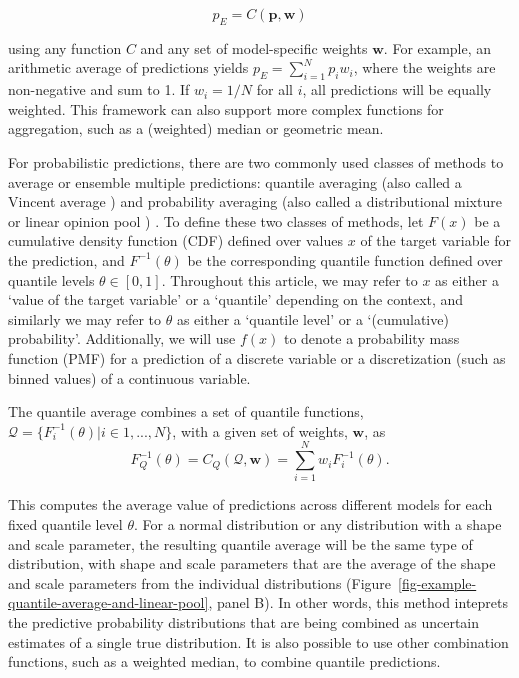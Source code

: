 \documentclass[
  article,
  shortnames,
  notitle]{jss}
\begin{document}
\[
p_E = C(\pmb{p}, \pmb{w}) 
\]

using any function \(C\) and any set of model-specific weights
\(\pmb{w}\). For example, an arithmetic average of predictions yields
\(p_E = \sum_{i=1}^Np_iw_i\), where the weights are non-negative and sum
to 1. If \(w_i = 1/N\) for all \(i\), all predictions will be equally
weighted. This framework can also support more complex functions for
aggregation, such as a (weighted) median or geometric mean.

For probabilistic predictions, there are two commonly used classes of
methods to average or ensemble multiple predictions: quantile averaging
(also called a Vincent average \citep{vincent1912}) and probability
averaging (also called a distributional mixture or linear opinion pool
\citep{stone1961}) \citep{lichtendahl2013}. To define these two classes
of methods, let \(F(x)\) be a cumulative density function (CDF) defined
over values \(x\) of the target variable for the prediction, and
\(F^{-1}(\theta)\) be the corresponding quantile function defined over
quantile levels \(\theta \in [0, 1]\). Throughout this article, we may
refer to \(x\) as either a `value of the target variable' or a
`quantile' depending on the context, and similarly we may refer to
\(\theta\) as either a `quantile level' or a `(cumulative) probability'.
Additionally, we will use \(f(x)\) to denote a probability mass function
(PMF) for a prediction of a discrete variable or a discretization (such
as binned values) of a continuous variable.

The quantile average combines a set of quantile functions,
\(\mathcal{Q} = \{F_i^{-1}(\theta)| i \in 1,...,N \}\), with a given set
of weights, \(\pmb{w}\), as \[
F^{-1}_Q(\theta) = C_Q(\mathcal{Q}, \pmb{w}) = \sum_{i = 1}^Nw_iF^{-1}_i(\theta).
\]

This computes the average value of predictions across different models
for each fixed quantile level \(\theta\). For a normal distribution or
any distribution with a shape and scale parameter, the resulting
quantile average will be the same type of distribution, with shape and
scale parameters that are the average of the shape and scale parameters
from the individual distributions
(Figure~\ref{fig-example-quantile-average-and-linear-pool}, panel B). In
other words, this method inteprets the predictive probability
distributions that are being combined as uncertain estimates of a single
true distribution. It is also possible to use other combination
functions, such as a weighted median, to combine quantile predictions.
\end{document}
